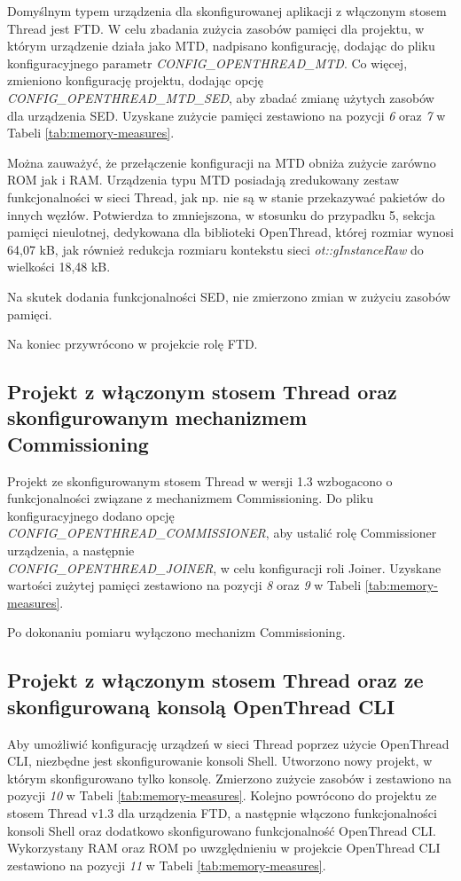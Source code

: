     Domyślnym typem urządzenia dla skonfigurowanej aplikacji z włączonym stosem Thread jest FTD. W celu zbadania zużycia zasobów pamięci dla projektu, w którym urządzenie działa jako MTD, nadpisano konfigurację, dodając do pliku konfiguracyjnego parametr \textit{CONFIG\_OPENTHREAD\_MTD}. Co więcej, zmieniono konfigurację projektu, dodając opcję \textit{CONFIG\_OPENTHREAD\_MTD\_SED}, aby zbadać zmianę użytych zasobów dla urządzenia SED. Uzyskane zużycie pamięci zestawiono na pozycji \textit{6} oraz \textit{7} w Tabeli \ref{tab:memory-measures}.

    Można zauważyć, że przełączenie konfiguracji na MTD obniża zużycie zarówno ROM jak i RAM. Urządzenia typu MTD posiadają zredukowany zestaw funkcjonalności w sieci Thread, jak np. nie są w stanie przekazywać pakietów do innych węzłów. Potwierdza to zmniejszona, w stosunku do przypadku 5, sekcja pamięci nieulotnej, dedykowana dla biblioteki OpenThread, której rozmiar wynosi 64,07 kB, jak również redukcja rozmiaru kontekstu sieci \textit{ot::gInstanceRaw} do wielkości 18,48 kB.

    Na skutek dodania funkcjonalności SED, nie zmierzono zmian w zużyciu zasobów pamięci.

    Na koniec przywrócono w projekcie rolę FTD.

    \subsection{Projekt z włączonym stosem Thread oraz skonfigurowanym mechanizmem Commissioning}
    Projekt ze skonfigurowanym stosem Thread w wersji 1.3 wzbogacono o funkcjonalności związane z mechanizmem Commissioning. Do pliku konfiguracyjnego dodano opcję \\\textit{CONFIG\_OPENTHREAD\_COMMISSIONER}, aby ustalić rolę Commissioner urządzenia, a następnie \\\textit{CONFIG\_OPENTHREAD\_JOINER}, w celu konfiguracji roli Joiner. Uzyskane wartości zużytej pamięci zestawiono na pozycji \textit{8} oraz \textit{9} w Tabeli \ref{tab:memory-measures}.
    
    Po dokonaniu pomiaru wyłączono mechanizm Commissioning.

    \subsection{Projekt z włączonym stosem Thread oraz ze skonfigurowaną konsolą OpenThread CLI}

    Aby umożliwić konfigurację urządzeń w sieci Thread poprzez użycie OpenThread CLI, niezbędne jest skonfigurowanie konsoli Shell. Utworzono nowy projekt, w którym skonfigurowano tylko konsolę. Zmierzono zużycie zasobów i zestawiono na pozycji \textit{10} w Tabeli \ref{tab:memory-measures}. Kolejno powrócono do projektu ze stosem Thread v1.3 dla urządzenia FTD, a następnie włączono funkcjonalności konsoli Shell oraz dodatkowo skonfigurowano funkcjonalność OpenThread CLI. Wykorzystany RAM oraz ROM po uwzględnieniu w projekcie OpenThread CLI zestawiono na pozycji \textit{11} w Tabeli \ref{tab:memory-measures}.
        
